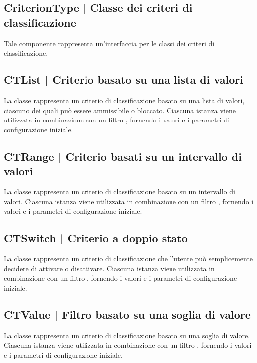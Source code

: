 \documentclass[10pt,a4paper,headinclude,footinclude,hidelinks]{scrreprt} %
\begin{document}
	\subsection[CriterionType]{CriterionType | Classe dei criteri di classificazione}
	\label{sec:stage:design:sistema:model.criteria:criteria}
	Tale componente rappresenta un'interfaccia per le classi dei criteri di classificazione.

	\subsection[CTList]{CTList | Criterio basato su una lista di valori}
	\label{sec:stage:design:sistema:model.criteria:list-criterion}
	La classe \textit{} rappresenta un criterio di classificazione basato su una lista di valori, ciascuno dei quali può essere ammissibile o bloccato. Ciascuna istanza viene utilizzata in combinazione con un filtro \textit{}, fornendo i valori e i parametri di configurazione iniziale.

	\subsection[CTRange]{CTRange | Criterio basati su un intervallo di valori}
	\label{sec:stage:design:sistema:model.criteria:range-criterion}
	La classe \textit{} rappresenta un criterio di classificazione basato su un intervallo di valori. Ciascuna istanza viene utilizzata in combinazione con un filtro \textit{}, fornendo i valori e i parametri di configurazione iniziale.

	\subsection[CTSwitch]{CTSwitch | Criterio a doppio stato}
	\label{sec:stage:design:sistema:model.criteria:switch-criterion}
	La classe \textit{} rappresenta un criterio di classificazione che l'utente può semplicemente decidere di attivare o disattivare. Ciascuna istanza viene utilizzata in combinazione con un filtro \textit{}, fornendo i valori e i parametri di configurazione iniziale.

	\subsection[CTValue]{CTValue | Filtro basato su una soglia di valore}
	\label{sec:stage:design:sistema:model.criteria:value-criterion}
	La classe \textit{} rappresenta un criterio di classificazione basato su una soglia di valore. Ciascuna istanza viene utilizzata in combinazione con un filtro \textit{}, fornendo i valori e i parametri di configurazione iniziale.
\end{document}

